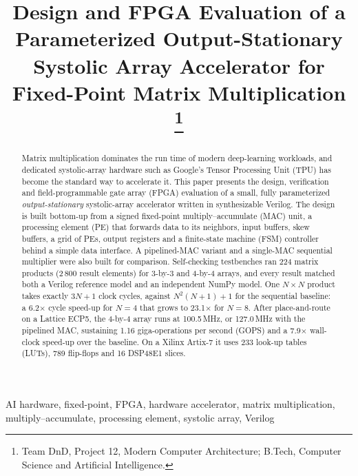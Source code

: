 \documentclass[conference]{IEEEtran}
\begin{document}
\title{Design and FPGA Evaluation of a Parameterized Output-Stationary Systolic Array Accelerator for Fixed-Point Matrix Multiplication%
\thanks{Team DnD, Project 12, Modern Computer Architecture; B.Tech, Computer Science and Artificial Intelligence.}}

\author{}

\maketitle

\begin{abstract}
Matrix multiplication dominates the run time of modern deep-learning
workloads, and dedicated systolic-array hardware such as Google's Tensor
Processing Unit (TPU) has become the standard way to accelerate it. This
paper presents the design, verification and field-programmable gate array
(FPGA) evaluation of a small, fully parameterized \emph{output-stationary}
systolic-array accelerator written in synthesizable Verilog. The design is
built bottom-up from a signed fixed-point multiply--accumulate (MAC) unit, a
processing element (PE) that forwards data to its neighbors, input buffers,
skew buffers, a grid of PEs, output registers and a finite-state machine (FSM)
controller behind a simple data interface. A pipelined-MAC variant and a
single-MAC sequential multiplier were also built for comparison.
Self-checking testbenches ran 224 matrix products (2\,800 result elements)
for 3-by-3 and 4-by-4 arrays, and every result matched both a Verilog
reference model and an independent NumPy model. One $N\times N$ product takes
exactly $3N+1$ clock cycles, against $N^2(N+1)+1$ for the sequential
baseline: a 6.2$\times$ cycle speed-up for $N=4$ that grows to
23.1$\times$ for $N=8$. After place-and-route on a Lattice ECP5, the 4-by-4
array runs at 100.5\,MHz, or 127.0\,MHz with the pipelined MAC, sustaining
1.16 giga-operations per second (GOPS) and a 7.9$\times$ wall-clock speed-up
over the baseline. On a Xilinx Artix-7 it uses 233 look-up tables (LUTs),
789 flip-flops and 16 DSP48E1 slices.
\end{abstract}

\begin{IEEEkeywords}
AI hardware, fixed-point, FPGA, hardware accelerator, matrix multiplication,
multiply--accumulate, processing element, systolic array, Verilog
\end{IEEEkeywords}
\end{document}
